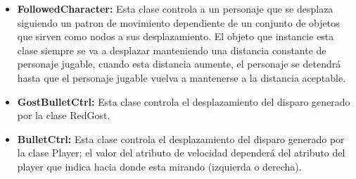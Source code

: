 \begin{itemize}
			\item \textbf{FollowedCharacter:} Esta clase controla a un personaje que se 
			desplaza siguiendo un patron de movimiento dependiente de un conjunto de objetos 
			que sirven como nodos a sus desplazamiento. El objeto que instancie esta clase 
			siempre se va a desplazar manteniendo una distancia constante de personaje jugable,
			cuando esta distancia aumente, el personaje se detendrá hasta que el personaje 
			jugable vuelva a mantenerse a la distancia aceptable.    
			\item \textbf{GostBulletCtrl:} Esta clase controla el desplazamiento del 
			disparo generado por la clase RedGost.
			\item \textbf{ BulletCtrl:} Esta clase controla el desplazamiento del 
			disparo generado por la clase Player; el valor del atributo de velocidad dependerá 
			del atributo del player que indica hacia donde esta mirando (izquierda o derecha).
		\end{itemize}	